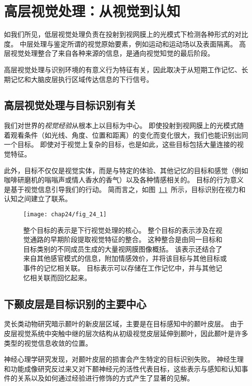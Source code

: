 \chapter{高层视觉处理：从视觉到认知} \label{chap:chap24}

如我们所见，低层视觉处理负责在投射到视网膜上的光模式下检测各种形式的对比度。
中层处理与鉴定所谓的视觉原始要素，例如运动和运动场以及表面隔离。
高层视觉处理整合了来自各种来源的信息，是通向视觉知觉的最后阶段。


高层视觉处理与识别环境的有意义行为特征有关，因此取决于从短期工作记忆、长期记忆和大脑皮层执行区域传达信息的下行信号。


\section{高层视觉处理与目标识别有关}

我们对世界的\textit{视觉经验}从根本上以目标为中心。
即使投射到视网膜上的光模式随着观看条件（如光线、角度、位置和距离）的变化而变化很大，我们也能识别出同一个目标。
即使对于视觉上复杂的目标，也是如此，这些目标包括大量连接的视觉特征。


此外，目标不仅仅是视觉实体，而是与特定的体验、其他记忆的目标和感觉（例如咖啡研磨机的嗡嗡声或情人香水的香气）以及各种情感相关的。
目标的行为意义是基于视觉信息引导我们的行动。
简而言之，如图~\ref{fig:24_1}~所示，目标识别在视力和认知之间建立了联系。


\begin{figure}[htbp]
	\centering
	\texttt{[image: chap24/fig\_24\_1]}
	\caption{整个目标的表示是下行视觉处理的核心。
		整个目标的表示涉及在视觉通路的早期阶段提取视觉特征的整合。
		这种整合是由同一目标和目标类别的不同成员生成的大量视网膜图像概括。
		该表示还结合了来自其他感官模式的信息，附加情感效价，并将该目标与其他目标或事件的记忆相关联。
		目标表示可以存储在工作记忆中，并与其他记忆相关联而回忆起来。}
	\label{fig:24_1}
\end{figure}



\section{下颞皮层是目标识别的主要中心}

灵长类动物研究暗示颞叶的新皮层区域，主要是在目标感知中的颞叶皮层。
由于皮层视觉系统中突触中继的层次结构从初级视觉皮层延伸到颞叶，因此颞叶是许多类型的视觉信息收敛的位置。


神经心理学研究发现，对颞叶皮层的损害会产生特定的目标识别失败。
神经生理和功能成像研究反过来又对下颞神经元的活性代表目标，这些表示与感知和认知事件的关系以及如何通过经验进行修饰的方式产生了显著的见解。


